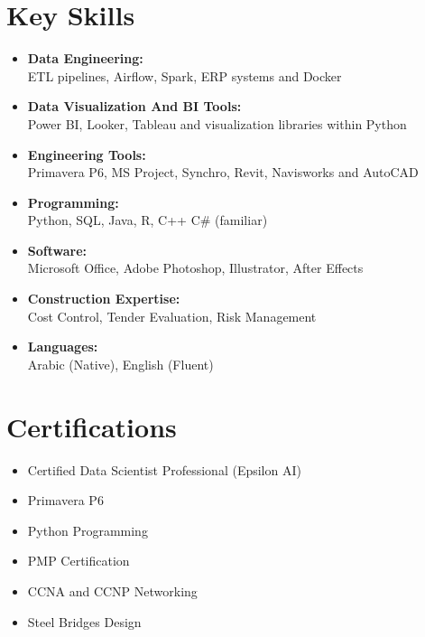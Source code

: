 \documentclass[10pt, letterpaper]{article}
\begin{document}
\section{Key Skills}
\vspace{-1.5ex} %
\begin{itemize}[leftmargin=*, itemsep=0.5ex] %
    \item \textbf{Data Engineering:} \\
    ETL pipelines, Airflow, Spark, ERP systems and Docker
        \item \textbf{Data Visualization And BI Tools:} \\
    Power BI, Looker, Tableau and visualization libraries within Python
    \item \textbf{Engineering Tools:} \\
    Primavera P6, MS Project, Synchro, Revit, Navisworks and AutoCAD
    \item \textbf{Programming:} \\
    Python, SQL, Java, R, C++ C\# (familiar)
    \item \textbf{Software:} \\
    Microsoft Office, Adobe Photoshop, Illustrator, After Effects
    \item \textbf{Construction Expertise:} \\
    Cost Control, Tender Evaluation, Risk Management
    \item \textbf{Languages:} \\
    Arabic (Native), English (Fluent)
\end{itemize}

\section{Certifications}
\vspace{-1ex} %
\begin{itemize}[leftmargin=*, itemsep=0.5ex] %
    \item Certified Data Scientist Professional (Epsilon AI)
    \item Primavera P6
    \item Python Programming
    \item PMP Certification
    \item CCNA and CCNP Networking
    \item Steel Bridges Design
\end{itemize}
\end{document}
